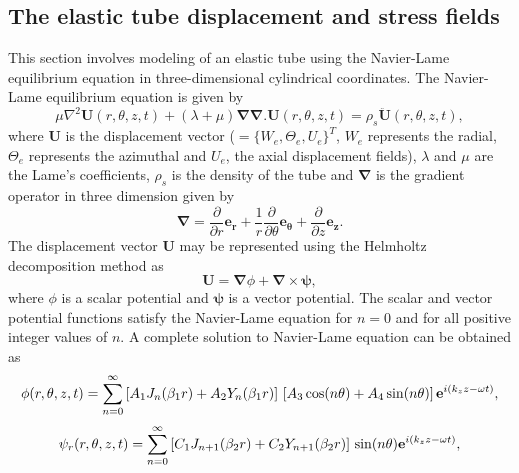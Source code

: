 \documentclass[11pt,cleanfoot]{asme2ej}
\begin{document}
\subsection{The elastic tube displacement and stress fields}\label{governing equation for 3d cylinder}
This section involves modeling of an elastic tube using the Navier-Lame equilibrium equation in three-dimensional cylindrical coordinates. The Navier-Lame equilibrium equation is given by~\cite{Martin2014}
\begin{equation}\label{Navier equation of motion 3d}
    \mu\nabla^{2}\mathbf{U}(r,\theta,z,t)+(\lambda+\mu)\pmb{\nabla}\pmb{\nabla}.\mathbf{U}(r,\theta,z,t) = \rho_s\mathbf{\ddot{U}}(r,\theta,z,t),
\end{equation}
where $\mathbf{U}$ is the displacement vector ($= \{W_e, \Theta_e, U_e\}^T$, $W_e$ represents the radial, $\Theta_e$ represents the azimuthal and $U_e$, the axial displacement fields), $\lambda$ and $\mu$ are the Lame's coefficients, $\rho_s$ is the density of the tube and $\pmb{\nabla}$ is the gradient operator in three dimension given by
\begin{equation}\label{del operator}
    \pmb{\nabla} = \frac{\partial}{\partial r}{\mathbf{e_r}} + \frac{1}{r}\frac{\partial}{\partial \theta}\mathbf{e}_{\pmb{\theta}} + \frac{\partial}{\partial z}\mathbf{e_z}.
\end{equation}
The displacement vector $\mathbf{U}$ may be represented using the Helmholtz decomposition method as
 \begin{equation}\label{Helmholtz equation 3d}
    \mathbf{U} = \pmb{\nabla}\phi+\pmb{\nabla}\times\pmb{\psi},
\end{equation}
where $\phi$ is a scalar potential and $\pmb{\psi}$ is a vector potential. 
The scalar and vector potential functions satisfy the Navier-Lame equation for $n=0$ and for all positive integer values of $n$. A complete solution to Navier-Lame equation can be obtained as
\begin{equation}\label{Scalar potential equation}
    \phi(r,\theta,z,t) = \sum_{n=0}^{\infty}\left[A_{1}J_{n}(\beta_1 r) + A_{2}Y_{n}(\beta_1 r)\right]\\ \left[A_{3}\cos(n\theta) + A_{4}\sin(n\theta)\right]\mathbf{e}^{i(k_{z}z-\omega t)},
\end{equation}
\begin{equation}\label{Vector potential equation r}
    \psi_{r}(r,\theta,z,t) = \sum_{n=0}^{\infty}\left[C_{1}J_{n+1}(\beta_2r) + C_{2}Y_{n+1}(\beta_2 r)\right]\\\sin(n\theta)\mathbf{e}^{i(k_{z}z-\omega t)},
\end{equation}
\end{document}
